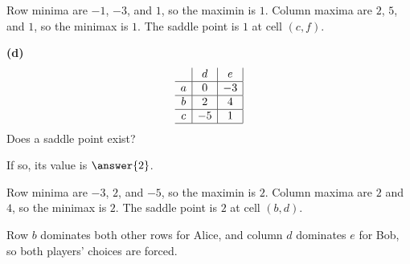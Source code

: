 \documentclass[12pt]{ximera}
\begin{document}
\begin{problem}
\begin{prompt}
\begin{feedback}
Row minima are $-1$, $-3$, and $1$, so the maximin is $1$. Column maxima are $2$, $5$,
and $1$, so the minimax is $1$. The saddle point is $1$ at cell $(c,f)$.
\end{feedback}
\end{prompt}

\begin{prompt}
\textbf{(d)}
\[
\begin{array}{c|c|c|}
\phantom{|} & d & e \\\hline
a & 0 & -3 \\\hline
b & 2 & 4 \\\hline
c & -5 & 1 \\\hline
\end{array}
\]
Does a saddle point exist?
\begin{multipleChoice}
\end{multipleChoice}
If so, its value is $\answer{2}$.

\begin{feedback}
Row minima are $-3$, $2$, and $-5$, so the maximin is $2$. Column maxima are $2$ and $4$,
so the minimax is $2$. The saddle point is $2$ at cell $(b,d)$.

Row $b$ dominates both other rows for Alice, and column $d$ dominates $e$ for Bob, so
both players' choices are forced.
\end{feedback}
\end{prompt}
\end{problem}
\end{document}

